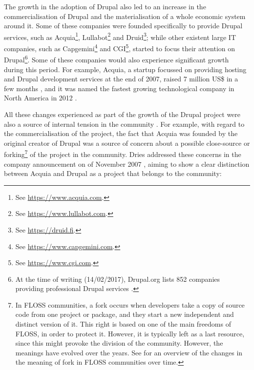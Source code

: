 The growth in the adoption of Drupal also led to an increase in the commercialisation of Drupal and the materialisation of a whole economic system around it. Some of these companies were founded specifically to provide Drupal services, such as Acquia\footnote{See \url{https://www.acquia.com}.}, Lullabot\footnote{See \url{https://www.lullabot.com}.} and Druid\footnote{See \url{https://druid.fi}.}; while other existent large IT companies, such as Capgemini\footnote{See \url{https://www.capgemini.com}.} and CGI\footnote{See \url{https://www.cgi.com}.}, started to focus their attention on Drupal\footnote{At the time of writing (14/02/2017), Drupal.org lists 852 companies providing professional Drupal services \parencite{drupal-marketplace:2017:Online}.}. Some of these companies would also experience significant growth during this period. For example, Acquia, a startup focussed on providing hosting and Drupal development services at the end of 2007, raised 7 million US\$ in a few months \parencite{drupal-acquia-7m:2017:Online}, and it was named the fastest growing technological company in North America in 2012 \parencite{drupal-acquia-fastest:2017:Online,}.

All these changes experienced as part of the growth of the Drupal project were also a source of internal tension in the community \parencite{drupal-7million:2017:Online}. For example, with regard to the commercialisation of the project, the fact that Acquia was founded by the original creator of Drupal was a source of concern about a possible close-source or forking\footnote{In FLOSS communities, a fork occurs when developers take a copy of source code from one project or package, and they start a new independent and distinct version of it. This right is based on one of the main freedoms of FLOSS, in order to protect it. However, it is typically left as a last resource, since this might provoke the division of the community. However, the meanings have evolved over the years. See \textcite{nyman2015understanding} for an overview of the changes in the meaning of fork in FLOSS communities over time.} of the project in the community. Dries addressed these concerns in the company announcement on  of November 2007 \parencite{drupal-acquia-announcement:Online}, aiming to show a clear distinction between Acquia and Drupal as a project that belongs to the community: 

